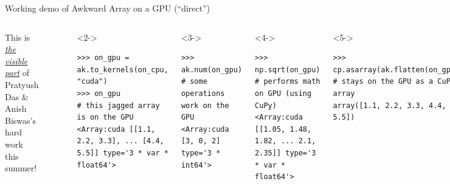 \documentclass[aspectratio=169]{beamer}
\begin{document}
\begin{frame}[fragile]{Working demo of Awkward Array on a GPU (``direct'')}
\large
\vspace{0.5 cm}
\begin{columns}
This is \underline{\it the visible part} of Pratyush Das \& Anish Biswas's hard work this summer!

\small
\begin{verbatim}
>>> import awkward1 as ak, numpy as np, cupy as cp
\end{verbatim}
\begin{verbatim}
>>> on_cpu = ak.Array([[1.1, 2.2, 3.3], [], [4.4, 5.5]])
>>> on_cpu                           # this jagged array is on the CPU
<Array [[1.1, 2.2, 3.3], [], [4.4, 5.5]] type='3 * var * float64'>
\end{verbatim}
\begin{uncoverenv}<2->
\begin{verbatim}
>>> on_gpu = ak.to_kernels(on_cpu, "cuda")
>>> on_gpu                           # this jagged array is on the GPU
<Array:cuda [[1.1, 2.2, 3.3], ... [4.4, 5.5]] type='3 * var * float64'>
\end{verbatim}
\end{uncoverenv}
\begin{uncoverenv}<3->
\begin{verbatim}
>>> ak.num(on_gpu)                   # some operations work on the GPU
<Array:cuda [3, 0, 2] type='3 * int64'>
\end{verbatim}
\end{uncoverenv}
\begin{uncoverenv}<4->
\begin{verbatim}
>>> np.sqrt(on_gpu)                  # performs math on GPU (using CuPy)
<Array:cuda [[1.05, 1.48, 1.82, ... 2.1, 2.35]] type='3 * var * float64'>
\end{verbatim}
\end{uncoverenv}
\begin{uncoverenv}<5->
\begin{verbatim}
>>> cp.asarray(ak.flatten(on_gpu))   # stays on the GPU as a CuPy array
array([1.1, 2.2, 3.3, 4.4, 5.5])
\end{verbatim}
\end{uncoverenv}
\end{columns}
\end{frame}
\end{document}

